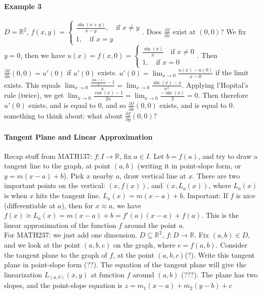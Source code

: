 \documentclass[tikz,10pt,letter]{article}
\theoremstyle{plain}
\theoremstyle{definition}
\begin{document}
\paragraph{Example 3}
$D=\mathbb{R}^2$, $f(x,y)=\begin{cases}\frac{\sin(x+y)}{x-y},\quad\text{if }x\neq y\\1,\quad\text{if }x=y\end{cases}$. Does $\frac{\partial f}{\partial x}$ exist at $(0,0)$? We fix $y=0$, then we have $u(x)=f(x,0)=\begin{cases}\frac{\sin(x)}{x}\quad\text{if }x\neq0\\1,\quad\text{if }x=0\end{cases}$. Then $\frac{\partial f}{\partial x}(0,0)=u'(0)$ if $u'(0)$ exists. $u'(0)=\lim_{x\rightarrow0}\frac{u(x)-u(0)}{x-0}$ if the limit exists. This equals $\lim_{x\rightarrow 0}\frac{\frac{\sin(x)}{x}-1}{x}=\lim_{x\rightarrow0}\frac{\sin(x)-x}{x^2}$. Applying l'Hopital's rule (twice), we get $\lim_{x\rightarrow0}\frac{\cos(x)-1}{2x}=\lim_{x\rightarrow0}\frac{-\sin(x)}{2}=0$. Then therefore $u'(0)$ exists, and is equal to $0$, and so $\frac{\partial f}{\partial x}(0,0)$ exists, and is equal to $0$. something to think about: what about $\frac{\partial f}{\partial y}(0,0)?$ 

\paragraph{Tangent Plane and Linear Approximation}
Recap stuff from MATH137: $f:I\rightarrow\mathbb{R}$, fix $a\in I$. Let $b=f(a)$, and try to draw a tangent line to the graph, at point $(a,b)$ (writing it in point-slope form, or $y=m(x-a)+b$). Pick $x$ nearby $a$, draw vertical line at $x$. There are two important points on the vertical: $(x,f(x))$, and $(x,L_a(x))$, where $L_a(x)$ is when $x$ hits the tangent line. $L_a(x)=m(x-a)+b$. Important: If $f$ is nice (differentiable at $a$), then for $x\approx a$, we have $f(x)\approx L_a(x)=m(x-a)+b=f'(a)(x-a)+f(a)$. This is the linear approximation of the function $f$ around the point $a$. \\ 
For MATH237: we just add one dimension. $D\subseteq\mathbb{R}^2$, $f:D\rightarrow\mathbb{R}$. Fix $(a,b)\in D$, and we look at the point $(a,b,c)$ on the graph, where $c=f(a,b)$. Consider the tangent plane to the graph of $f$, at the point $(a,b,c)$(?). Write this tangent plane in point-slope form (??). The equation of the tangent plane will give the linearization $L_{(a,b)}(x,y)$ at function $f$ around $(a,b)$ (???). The plane has two slopes, and the point-slope equation is $z=m_1(x-a)+m_2(y-b)+c$ 
\end{document}
